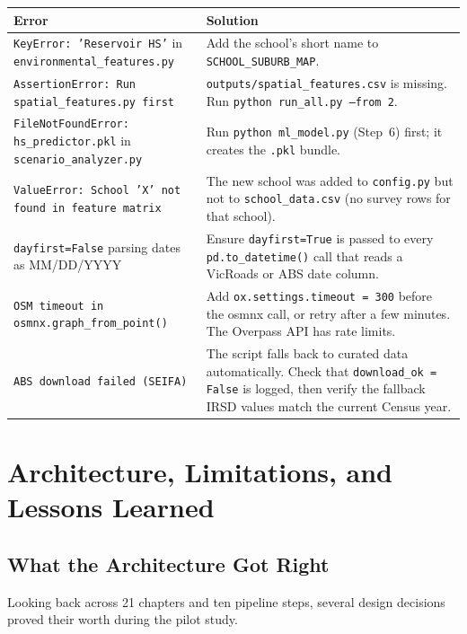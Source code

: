 \documentclass[11pt,a4paper,openany]{book}
\begin{document}
\begin{center}
\begin{tabular}{L{4cm}L{9cm}}
\toprule
Error & Solution \\
\midrule
\texttt{KeyError: 'Reservoir HS'} in \texttt{environmental\_features.py} &
  Add the school's short name to \texttt{SCHOOL\_SUBURB\_MAP}. \\
\texttt{AssertionError: Run spatial\_features.py first} &
  \texttt{outputs/spatial\_features.csv} is missing. Run \texttt{python run\_all.py --from 2}.  \\
\texttt{FileNotFoundError: hs\_predictor.pkl} in \texttt{scenario\_analyzer.py} &
  Run \texttt{python ml\_model.py} (Step~6) first; it creates the \texttt{.pkl} bundle. \\
\texttt{ValueError: School 'X' not found in feature matrix} &
  The new school was added to \texttt{config.py} but not to \texttt{school\_data.csv}
  (no survey rows for that school). \\
\texttt{dayfirst=False} parsing dates as MM/DD/YYYY &
  Ensure \texttt{dayfirst=True} is passed to every \texttt{pd.to\_datetime()} call
  that reads a VicRoads or ABS date column. \\
\texttt{OSM timeout in osmnx.graph\_from\_point()} &
  Add \texttt{ox.settings.timeout = 300} before the osmnx call, or retry after a few
  minutes. The Overpass API has rate limits. \\
\texttt{ABS download failed (SEIFA)} &
  The script falls back to curated data automatically. Check that
  \texttt{download\_ok = False} is logged, then verify the fallback IRSD values
  match the current Census year. \\
\bottomrule
\end{tabular}
\end{center}

\chapter{Architecture, Limitations, and Lessons Learned}

\section{What the Architecture Got Right}

Looking back across 21 chapters and ten pipeline steps, several design decisions proved
their worth during the pilot study.
\end{document}
